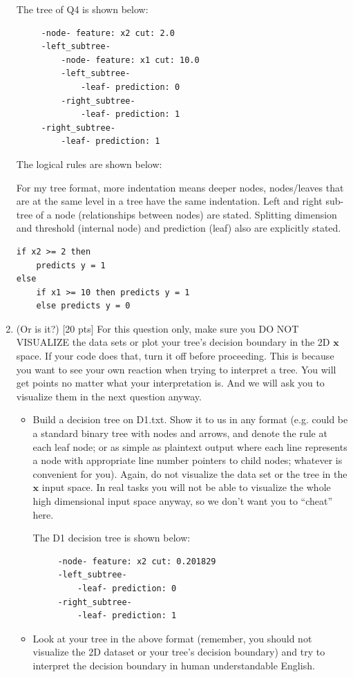 \documentclass[a4paper]{article}
\theoremstyle{definition}
\def\x{\mathbf x}
\begin{document}
\begin{enumerate}
{\color{blue}
The tree of Q4 is shown below:
\begin{verbatim}
     -node- feature: x2 cut: 2.0
     -left_subtree-
         -node- feature: x1 cut: 10.0
         -left_subtree-
             -leaf- prediction: 0
         -right_subtree-
             -leaf- prediction: 1
     -right_subtree-
         -leaf- prediction: 1
\end{verbatim}
The logical rules are shown below:

For my tree format, more indentation means deeper nodes, nodes/leaves that are at the same level in a tree have the same indentation. Left and right sub-tree of a node (relationships between nodes) are stated. Splitting dimension and threshold (internal node) and prediction (leaf) also are explicitly stated.

\begin{verbatim}
if x2 >= 2 then
    predicts y = 1
else
    if x1 >= 10 then predicts y = 1
    else predicts y = 0
\end{verbatim}
}

\item (Or is it?)  [20 pts] For this question only, make sure you DO NOT VISUALIZE the data sets or plot your tree's decision boundary in the 2D $\x$ space.  If your code does that, turn it off before proceeding.  This is because you want to see your own reaction when trying to interpret a tree.  You will get points no matter what your interpretation is.
And we will ask you to visualize them in the next question anyway.
  \begin{itemize}
  
  \item Build a decision tree on D1.txt.  Show it to us in any format (e.g. could be a standard binary tree with nodes and arrows, and denote the rule at each leaf node; or as simple as plaintext output where each line represents a node with appropriate line number pointers to child nodes; whatever is convenient for you). Again, do not visualize the data set or the tree in the $\x$ input space.  In real tasks you will not be able to visualize the whole high dimensional input space anyway, so we don't want you to ``cheat'' here. 

  {\color{blue}
The D1 decision tree is shown below:
\begin{verbatim}
     -node- feature: x2 cut: 0.201829
     -left_subtree-
         -leaf- prediction: 0
     -right_subtree-
         -leaf- prediction: 1
\end{verbatim}
}
  \item Look at your tree in the above format (remember, you should not visualize the 2D dataset or your tree's decision boundary) and try to interpret the decision boundary in human understandable English. 


\end{itemize}
\end{enumerate}
\end{document}
